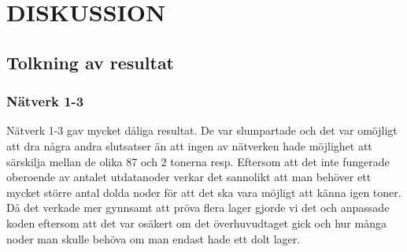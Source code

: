 \documentclass[a4paper,10pt]{article}
\begin{document}
\section{DISKUSSION}

\subsection{Tolkning av resultat}


\subsubsection{Nätverk 1-3}
Nätverk 1-3 gav mycket dåliga resultat. De var slumpartade och det var omöjligt att dra några andra slutsatser än att ingen av nätverken hade möjlighet att särskilja mellan de olika 87 och 2 tonerna resp. Eftersom att det inte fungerade oberoende av antalet utdatanoder verkar det sannolikt att man behöver ett mycket större antal dolda noder för att det ska vara möjligt att känna igen toner. Då det verkade mer gynnsamt att pröva flera lager gjorde vi det och anpassade koden eftersom att det var osäkert om det överhuvudtaget gick och hur många noder man skulle behöva om man endast hade ett dolt lager.
\end{document}
